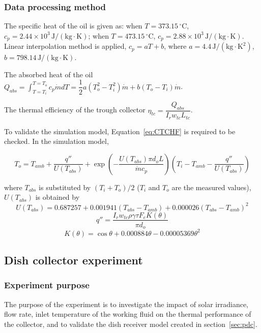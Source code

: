 \subsubsection{Data processing method}
The specific heat of the oil is given as: when $T = 373.15 \,\mathrm{^\circ C}$, $c_p = 2.44\times10^3\,\mathrm{J/(kg\cdot K)}$; when $T = 473.15\,\mathrm{^\circ C}$, $c_p = 2.88\times10^3\,\mathrm{J/(kg\cdot K)}$. Linear interpolation method is applied, $c_p = aT + b$, where $a = 4.4\,\mathrm{J/(kg \cdot K^2)}$, $b = 798.14\,\mathrm{J/(kg\cdot K)}$.

The absorbed heat of the oil $Q_{abs} = \int_{T=T_i}^{T = T_o}c_p\dot{m}dT = \dfrac{1}{2}a(T_o^2 - T_i^2)\dot{m} + b (T_o - T_i)\dot{m}$.

The thermal efficiency of the trough collector $\eta_{tc} = \dfrac{Q_{abs}}{I_rw_{tc}L_{tc}}$.

To validate the simulation model, Equation~\ref{eq:CTCHF} is required to be checked. In the simulation model,

\begin{equation}
	T_{o}=T_{amb} + \dfrac{q''}{U(T_{abs})} + \exp(-\frac{U(T_{abs})\pi d_o L}{\dot{m}c_{p}})(T_{i}-T_{amb}-\dfrac{q''}{U(T_{abs})})
	\label{eq:CheckT_o}
\end{equation}

where $T_{abs}$ is substituted by $(T_i + T_o)/2$ ($T_i$ and $T_o$ are the measured values), $U(T_{abs})$ is obtained by~\cite{Romero2007}
\begin{equation}
	U(T_{abs}) = 0.687257 + 0.001941(T_{abs} - T_{amb}) + 0.000026(T_{abs} - T_{amb})^2
\end{equation}
\begin{equation}
	q'' = \frac{I_r w_{tc} \rho \gamma \tau F_e K(\theta)}{\pi d_o}
\end{equation}
\begin{equation}
	K(\theta) = \cos\theta+0.000884\theta-0.00005369\theta^2
\end{equation}

\subsection{Dish collector experiment}
\subsubsection{Experiment purpose}
The purpose of the experiment is to investigate the impact of solar irradiance, flow rate, inlet temperature of the working fluid on the thermal performance of the collector, and to validate the dish receiver model created in section~\ref{sec:pdc}.

